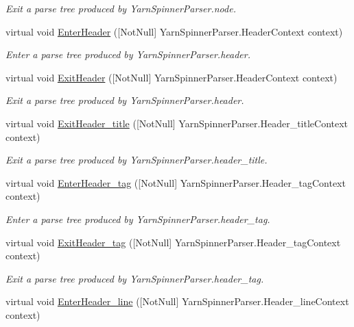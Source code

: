 \begin{DoxyCompactItemize}
\begin{DoxyCompactList}\small\item\em Exit a parse tree produced by Yarn\-Spinner\-Parser.\-node. \end{DoxyCompactList}\item 
virtual void \hyperlink{a00196_a78dc9c70370b2ea9432cd42ffb3e9fb4}{Enter\-Header} (\mbox{[}Not\-Null\mbox{]} Yarn\-Spinner\-Parser.\-Header\-Context context)
\begin{DoxyCompactList}\small\item\em Enter a parse tree produced by Yarn\-Spinner\-Parser.\-header. \end{DoxyCompactList}\item 
virtual void \hyperlink{a00196_a6e202bf625b40c0aae4829c9b7200fe9}{Exit\-Header} (\mbox{[}Not\-Null\mbox{]} Yarn\-Spinner\-Parser.\-Header\-Context context)
\begin{DoxyCompactList}\small\item\em Exit a parse tree produced by Yarn\-Spinner\-Parser.\-header. \end{DoxyCompactList}\item 
virtual void \hyperlink{a00196_aa6b04ccce84fc37c85731c8d0ab60d1c}{Exit\-Header\-\_\-title} (\mbox{[}Not\-Null\mbox{]} Yarn\-Spinner\-Parser.\-Header\-\_\-title\-Context context)
\begin{DoxyCompactList}\small\item\em Exit a parse tree produced by Yarn\-Spinner\-Parser.\-header\-\_\-title. \end{DoxyCompactList}\item 
virtual void \hyperlink{a00196_a7e46ec306ac8412b4f300aec4c3a6a7c}{Enter\-Header\-\_\-tag} (\mbox{[}Not\-Null\mbox{]} Yarn\-Spinner\-Parser.\-Header\-\_\-tag\-Context context)
\begin{DoxyCompactList}\small\item\em Enter a parse tree produced by Yarn\-Spinner\-Parser.\-header\-\_\-tag. \end{DoxyCompactList}\item 
virtual void \hyperlink{a00196_a6d2ef3bda1ff771ae9bf39b2842b1f69}{Exit\-Header\-\_\-tag} (\mbox{[}Not\-Null\mbox{]} Yarn\-Spinner\-Parser.\-Header\-\_\-tag\-Context context)
\begin{DoxyCompactList}\small\item\em Exit a parse tree produced by Yarn\-Spinner\-Parser.\-header\-\_\-tag. \end{DoxyCompactList}\item 
virtual void \hyperlink{a00196_a7d7c66a57f3b9621cec9eafa103f4a92}{Enter\-Header\-\_\-line} (\mbox{[}Not\-Null\mbox{]} Yarn\-Spinner\-Parser.\-Header\-\_\-line\-Context context)

\end{DoxyCompactItemize}

